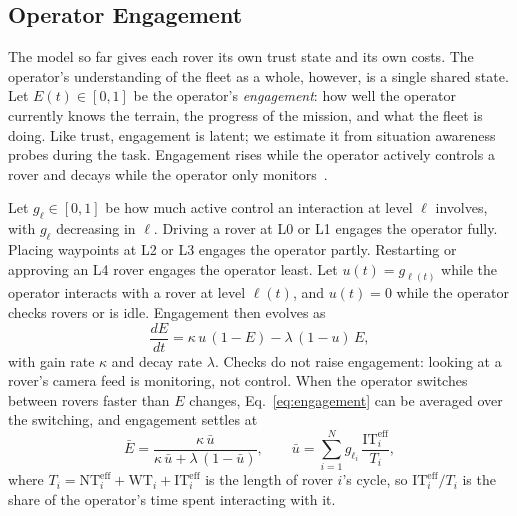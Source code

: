 \documentclass[conference]{IEEEtran}
\begin{document}
\subsection{Operator Engagement}
\label{sec:engagement}
The model so far gives each rover its own trust state and its own
costs. The operator's understanding of the fleet as a whole, however,
is a single shared state. Let $E(t) \in [0,1]$ be the operator's
\emph{engagement}: how well the operator currently knows the terrain,
the progress of the mission, and what the fleet is doing. Like trust,
engagement is latent; we estimate it from situation awareness probes
during the task. Engagement rises while the operator actively controls
a rover and decays while the operator only
monitors~\cite{endsley1995outoftheloop,kaber2004effects}.

Let $g_\ell \in [0,1]$ be how much active control an interaction at
level $\ell$ involves, with $g_\ell$ decreasing in $\ell$. Driving a
rover at L0 or L1 engages the operator fully. Placing waypoints at L2
or L3 engages the operator partly. Restarting or approving an L4 rover
engages the operator least. Let $u(t) = g_{\ell(t)}$ while the
operator interacts with a rover at level $\ell(t)$, and $u(t) = 0$
while the operator checks rovers or is idle. Engagement then evolves as
\begin{equation}
  \frac{dE}{dt} = \kappa\, u\,(1 - E) - \lambda\,(1 - u)\,E ,
  \label{eq:engagement}
\end{equation}
with gain rate $\kappa$ and decay rate $\lambda$. Checks do not raise
engagement: looking at a rover's camera feed is monitoring, not
control. When the operator switches between rovers faster than $E$
changes, Eq.~\eqref{eq:engagement} can be averaged over the switching,
and engagement settles at
\begin{equation}
  \bar{E} = \frac{\kappa\,\bar{u}}{\kappa\,\bar{u} + \lambda\,(1-\bar{u})},
  \qquad
  \bar{u} = \sum_{i=1}^{N} g_{\ell_i}\,\frac{\mathrm{IT}^{\mathrm{eff}}_i}{T_i},
  \label{eq:engagement-ss}
\end{equation}
where $T_i = \mathrm{NT}^{\mathrm{eff}}_i + \mathrm{WT}_i +
\mathrm{IT}^{\mathrm{eff}}_i$ is the length of rover $i$'s cycle, so
$\mathrm{IT}^{\mathrm{eff}}_i / T_i$ is the share of the operator's
time spent interacting with it.
\end{document}
